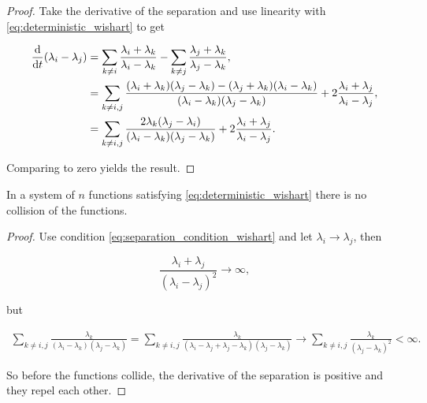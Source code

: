 \begin{proof}

    Take the derivative of the separation and use linearity with \eqref{eq:deterministic_wishart} to get

    \begin{align*}
        \frac{\mathrm d}{\mathrm d t}(\lambda_i - \lambda_j) &= \sum_{k\neq i} \frac{\lambda_i + \lambda_k}{\lambda_i - \lambda_k} - \sum_{k\neq j} \frac{\lambda_j + \lambda_k}{\lambda_j - \lambda_k}, \\
        &= \sum_{k \neq i,j} \frac{ (\lambda_i + \lambda_k)(\lambda_j - \lambda_k) - (\lambda_j + \lambda_k)(\lambda_i - \lambda_k) }{(\lambda_i - \lambda_k)(\lambda_j - \lambda_k)} + 2\frac{\lambda_i + \lambda_j}{\lambda_i - \lambda_j},\\
        &= \sum_{k\neq i,j} \frac{2\lambda_k(\lambda_j - \lambda_i)}{(\lambda_i-\lambda_k)(\lambda_j-\lambda_k)} + 2 \frac{\lambda_i + \lambda_j}{\lambda_i - \lambda_j}.
    \end{align*}

    Comparing to zero yields the result.
\end{proof}

\begin{corollary}
    In a system of $n$ functions satisfying \eqref{eq:deterministic_wishart} there is no collision of the functions.
\end{corollary}

\begin{proof}
    Use condition \eqref{eq:separation_condition_wishart} and let $\lambda_i \to \lambda_j$, then

    \begin{equation*}
        \frac{\lambda_i + \lambda_j}{(\lambda_i-\lambda_j)^2} \to \infty,
    \end{equation*}

    \noindent but

    \begin{align*}
        \sum_{k\neq i,j} \frac{\lambda_k}{(\lambda_i-\lambda_k)(\lambda_j-\lambda_k)} = \sum_{k\neq i,j} \frac{\lambda_k}{(\lambda_i-\lambda_j + \lambda_j -\lambda_k)(\lambda_j-\lambda_k)} \to \sum_{k\neq i,j} \frac{\lambda_k}{(\lambda_j-\lambda_k)^2} < \infty.
    \end{align*}

    So before the functions collide, the derivative of the separation is positive and they repel each other.
\end{proof}

